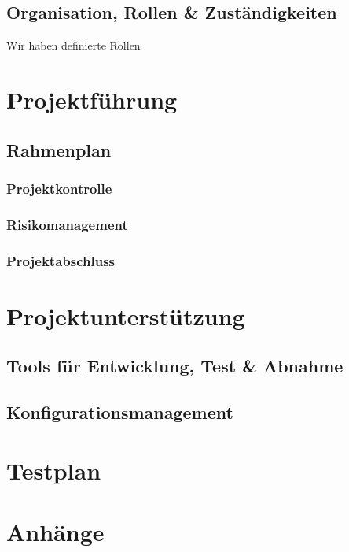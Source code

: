 \documentclass[a4paper, 10pt, fleqn]{article}
\begin{document}
\subsection{Organisation, Rollen \& Zuständigkeiten}
Wir haben definierte Rollen
\section{Projektführung}
\subsection{Rahmenplan}
\subsubsection{Projektkontrolle}

\subsubsection{Risikomanagement}

\subsubsection{Projektabschluss}

\section{Projektunterstützung}
\subsection{Tools für Entwicklung, Test \& Abnahme}

\subsection{Konfigurationsmanagement}

\section{Testplan}


\section{Anhänge}
\end{document}
